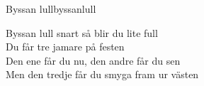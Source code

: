 \begin{song}{Byssan lull}{byssanlull}
\begin{vers}
\repopen Byssan lull snart så blir du lite full\\
Du får tre jamare på festen \repclose\\
Den ene får du nu, den andre får du sen\\
Men den tredje får du smyga fram ur västen\\
\end{vers}
\end{song}
